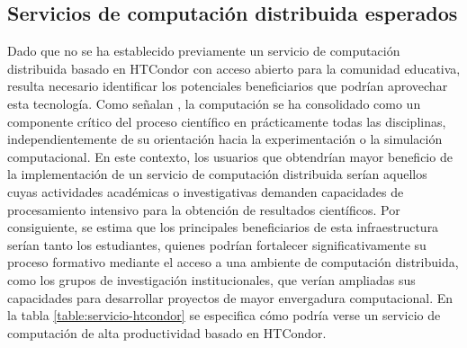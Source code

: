 \subsection{Servicios de computación distribuida esperados}
\noindent
Dado que no se ha establecido previamente un servicio de computación distribuida basado en HTCondor con acceso abierto para la comunidad educativa, resulta necesario identificar los potenciales beneficiarios que podrían aprovechar esta tecnología. Como señalan \cite{Wilson2016}, la computación se ha consolidado como un componente crítico del proceso científico en prácticamente todas las disciplinas, independientemente de su orientación hacia la experimentación o la simulación computacional. En este contexto, los usuarios que obtendrían mayor beneficio de la implementación de un servicio de computación distribuida serían aquellos cuyas actividades académicas o investigativas demanden capacidades de procesamiento intensivo para la obtención de resultados científicos. Por consiguiente, se estima que los principales beneficiarios de esta infraestructura serían tanto los estudiantes, quienes podrían fortalecer significativamente su proceso formativo mediante el acceso a una ambiente de computación distribuida, como los grupos de investigación institucionales, que verían ampliadas sus capacidades para desarrollar proyectos de mayor envergadura computacional. En la tabla \ref{table:servicio-htcondor} se especifica cómo podría verse un servicio de computación de alta productividad basado en HTCondor.

